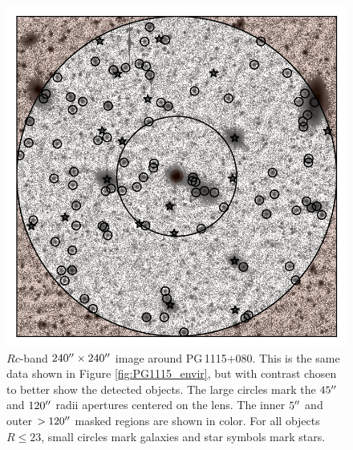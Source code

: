 \documentclass[useAMS,usenatbib]{mnras}
\newcommand\pg{PG\,1115$+$080}
\begin{document}
\begin{figure}
\includegraphics[width=\linewidth]{FOV_PG1115.png}
\caption{$Rc$-band $240\hbox{$^{\prime\prime}$}\times240\hbox{$^{\prime\prime}$}$ image around \pg . This is the same data shown in Figure \ref{fig:PG1115_envir}, but with contrast chosen to better show the detected objects. The large circles mark the $45\hbox{$^{\prime\prime}$}$ and $120\hbox{$^{\prime\prime}$}$ radii apertures centered on the lens. The inner $5\hbox{$^{\prime\prime}$}$ and outer $>120\hbox{$^{\prime\prime}$}$ masked regions are shown in color. For all objects $R\leq23$, small circles mark galaxies and star symbols mark stars.}
\label{fig:fovPG1115}
\end{figure}
\end{document}
